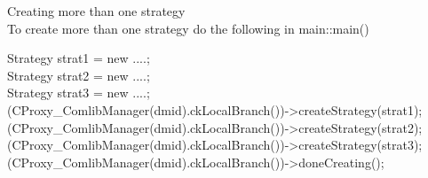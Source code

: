 Creating more than one strategy \\
To create more than one strategy do the following in main::main()

Strategy strat1 = new ....; \\
Strategy strat2 = new ....; \\
Strategy strat3 = new ....; \\

(CProxy\_ComlibManager(dmid).ckLocalBranch())->createStrategy(strat1); \\
(CProxy\_ComlibManager(dmid).ckLocalBranch())->createStrategy(strat2); \\
(CProxy\_ComlibManager(dmid).ckLocalBranch())->createStrategy(strat3); \\

(CProxy\_ComlibManager(dmid).ckLocalBranch())->doneCreating(); \\

